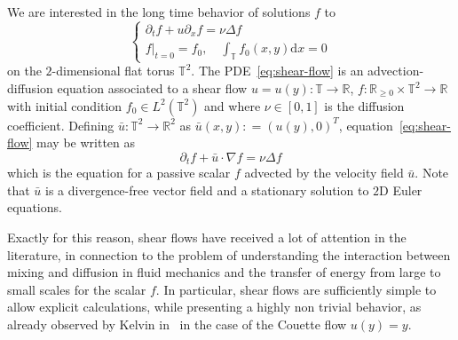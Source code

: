 \documentclass[11pt,oneside,reqno]{amsart}
\newcommand{\mathd}{\mathrm{d}}
\numberwithin{equation}{section}
\begin{document}
We are interested in the long time behavior of solutions $f$ to
\begin{equation}
  \left\{\begin{array}{l}
    \partial_t f + u \partial_x f = \nu \Delta f\\
    f|_{t = 0} = f_0, \quad \int_{\mathbb{T}} f_0 (x, y) \mathd x = 0
  \end{array}\right. \label{eq:shear-flow}
\end{equation}
on the $2$-dimensional flat torus $\mathbb{T}^2$. The
PDE~\eqref{eq:shear-flow} is an advection-diffusion equation associated to a
shear flow $u = u (y) : \mathbb{T} \rightarrow \mathbb{R}$, $f :
\mathbb{R}_{\geqslant 0} \times \mathbb{T}^2 \rightarrow \mathbb{R}$ with
initial condition $f_0 \in L^2 (\mathbb{T}^2)$ and where $\nu \in [0, 1]$ is
the diffusion coefficient. Defining $\bar{u} : \mathbb{T}^2 \rightarrow
\mathbb{R}^2$ as $\bar{u} (x, y) : = (u (y), 0)^T$,
equation~\eqref{eq:shear-flow} may be written as
\begin{equation}
  \partial_t f + \bar{u} \cdot \nabla f = \nu \Delta f
  \label{eq:passive-scalar}
\end{equation}
which is the equation for a passive scalar $f$ advected by the velocity field
$\bar{u}$. Note that $\bar{u}$ is a divergence-free vector field and a
stationary solution to $2$D Euler equations.

Exactly for this reason, shear flows have received a lot of attention in the
literature, in connection to the problem of understanding the interaction
between mixing and diffusion in fluid mechanics and the transfer of energy
from large to small scales for the scalar $f$. In particular, shear flows are
sufficiently simple to allow explicit calculations, while presenting a highly
non trivial behavior, as already observed by Kelvin in~{\cite{kelvin}} in the
case of the Couette flow $u (y) = y$.
\end{document}
